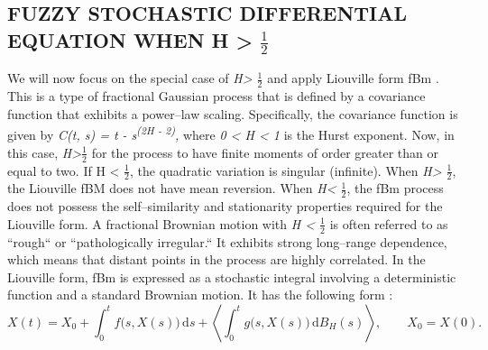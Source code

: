 \documentclass[12pt,a4paper]{report}
\numberwithin{equation}{section}
\begin{document}
\hypertarget{fuzzy-sde-h-gt-half}{%
\subsection{\texorpdfstring{FUZZY STOCHASTIC DIFFERENTIAL EQUATION
WHEN H \textgreater{} $\frac{1}{2}$
}{FUZZY STOCHASTIC DIFFERENTIAL EQUATION WHEN H > 1/2}}\label{fuzzy-sde-h-gt-half}}

We will now focus on the special case of \emph{H\textgreater{} $\frac{1}{2}$} and
apply Liouville form fBm \cite{thao2006approximate_80} \cite{jafari2021fuzzy_81}. This is a type of fractional
Gaussian process that is defined by a covariance function that exhibits
a power--law scaling. Specifically, the covariance function is given by
\emph{C(t, s) = \textbar t - s\textbar{}\textsuperscript{(2H - 2)},}
where \emph{0 \textless{} H \textless{} 1} is the Hurst exponent. Now,
in this case, \emph{H\textgreater$\frac{1}{2}$} for the process to have finite
moments of order greater than or equal to two. If H \textless{} $\frac{1}{2}$, the
quadratic variation is singular (infinite). When \emph{H\textgreater{} $\frac{1}{2}$}, the
Liouville fBM does not have mean reversion. When \emph{H\textless{} $\frac{1}{2}$},
the fBm process does not possess the self--similarity and stationarity
properties required for the Liouville form. A fractional Brownian motion
with \emph{H \textless{} $\frac{1}{2}$} is often referred to as ``rough`` or
``pathologically irregular.`` It exhibits strong long--range dependence,
which means that distant points in the process are highly correlated. In
the Liouville form, fBm is expressed as a stochastic integral involving
a deterministic function and a standard Brownian motion. It has the
following form \cite{thao2006approximate_80} :
\begin{equation}\tag{5.1.7}\label{eq:5.1.7}
X(t)
= X_{0}
+ \int_{0}^{t} f\bigl(s, X(s)\bigr)\,\mathrm{d}s
+ \left\langle \int_{0}^{t} g\bigl(s, X(s)\bigr)\,\mathrm{d}B_{H}(s) \right\rangle,
\qquad X_{0}=X(0).
\end{equation}
\end{document}

